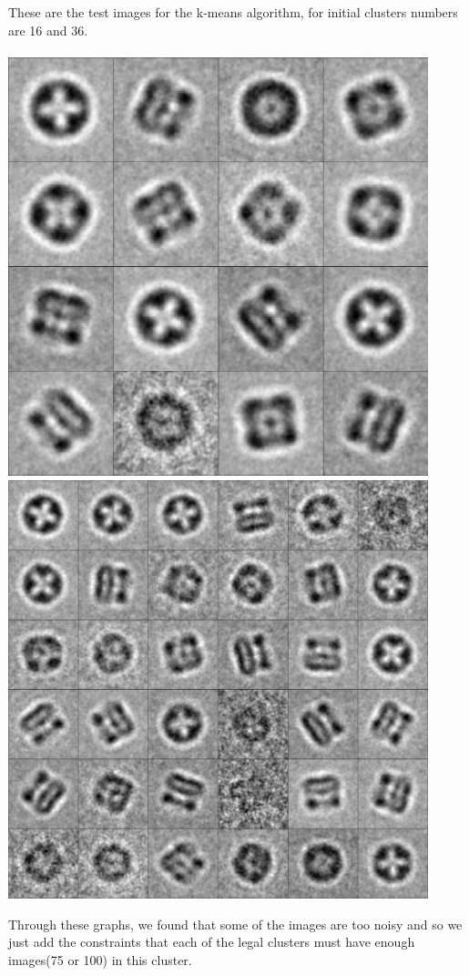 \documentclass{article}
\begin{document}
These are the test images for the k-means algorithm, for initial clusters numbers are 16 and 36.\\
~\\
\includegraphics[width=4.8in]{raw_kmeans_16}
~\\
\includegraphics[width=4.8in]{raw_kmeans_36}
\par
Through these graphs, we found that some of the images are too noisy and so we just add the constraints that each of the legal clusters must have enough images(75 or 100) in this cluster.\\
\end{document}
